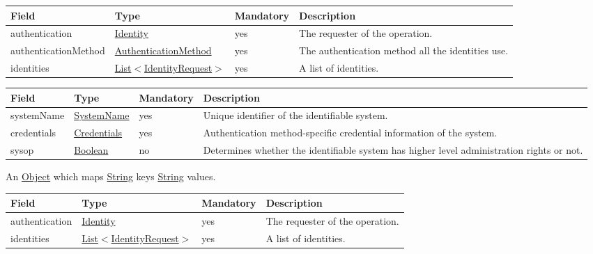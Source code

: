 \documentclass[a4paper]{arrowhead}
\newcommand{\pref}[1]{{\textcolor{ArrowheadGrey}{\hyperref[sec:model:primitives:#1]{#1}}}}
\begin{document}
 
\begin{table}[ht!]
\begin{tabularx}{\textwidth}{| p{3.3cm} | p{3.4cm} | p{2cm} | X |} \hline
\rowcolor{gray!33} Field & Type & Mandatory & Description \\ \hline
authentication & \hyperref[sec:model:Identity]{Identity} & yes & The requester of the operation. \\ \hline
authenticationMethod & \pref{AuthenticationMethod} & yes & The authentication method all the identities use. \\ \hline
identities & \pref{List}$<$\hyperref[sec:model:IdentityRequest]{IdentityRequest}$>$ & yes & A list of identities. \\ \hline
\end{tabularx}
\end{table}

\clearpage

 
\begin{table}[ht!]
\begin{tabularx}{\textwidth}{| p{2.5cm} | p{2.5cm} | p{2cm} | X |} \hline
\rowcolor{gray!33} Field & Type & Mandatory & Description \\ \hline
systemName & \pref{SystemName} & yes & Unique identifier of the identifiable system. \\ \hline
credentials &\hyperref[sec:model:Credentials]{Credentials} & yes & Authentication method-specific credential information of the system. \\ \hline
sysop & \pref{Boolean} & no & Determines whether the identifiable system has higher level administration rights or not. \\ \hline
\end{tabularx}
\end{table}


An \pref{Object} which maps \pref{String} keys \pref{String} values.

 
\begin{table}[ht!]
\begin{tabularx}{\textwidth}{| p{3.3cm} | p{3.4cm} | p{2cm} | X |} \hline
\rowcolor{gray!33} Field & Type & Mandatory & Description \\ \hline
authentication & \hyperref[sec:model:Identity]{Identity} & yes & The requester of the operation. \\ \hline
identities & \pref{List}$<$\hyperref[sec:model:IdentityRequest]{IdentityRequest}$>$ & yes & A list of identities. \\ \hline
\end{tabularx}
\end{table}
\end{document}
